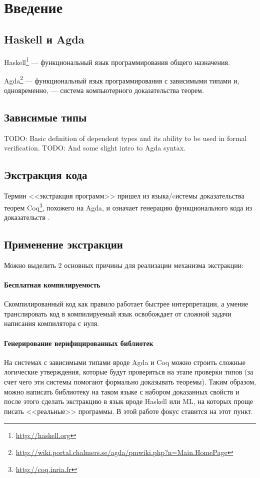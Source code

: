 \section{Введение}

\subsection{Haskell и Agda}

Haskell\footnote{\url{http://haskell.org}} --- функциональный язык программирования
общего назначения.

Agda\footnote{\url{http://wiki.portal.chalmers.se/agda/pmwiki.php?n=Main.HomePage}} ---
функциональный язык программирования с зависимыми типами и, одновременно, ---
система компьютерного доказательства теорем.

\subsection{Зависимые типы}

TODO: Basic definition of dependent types and its ability to be used in formal verification.
TODO: And some slight intro to Agda syntax.

\subsection{Экстракция кода}\label{sec:intro-extraction}

Термин <<экстракция программ>> пришел из языка/cистемы доказательства теорем
Coq\footnote{\url{http://coq.inria.fr}}, похожего на Agda, и означает генерацию
функционального кода из доказательств \cite{Let02}.

\subsection{Применение экстракции}

Можно выделить 2 основных причины для реализации механизма экстракции:

\paragraph{Бесплатная компилируемость}

Скомпилированный код как правило работает быстрее интерпретации, а умение
транслировать код в компилируемый язык освобождает от сложной задачи
написания компилятора с нуля.

\paragraph{Генерирование верифицированных библиотек}

На системах с зависимыми типами вроде Agda и Coq можно строить
сложные логические утверждения, которые будут проверяться на этапе
проверки типов (за счет чего эти системы помогают формально доказывать теоремы).
Таким образом, можно написать библиотеку на таком языке с набором доказанных
свойств и после этого сделать экстракцию в язык вроде Haskell или ML,
на которых проще писать <<реальные>> программы. В этой работе фокус ставится на этот пункт.
